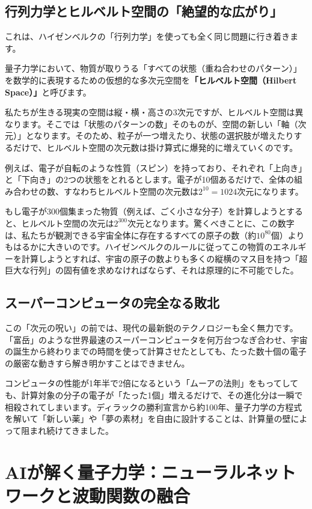 \subsection{行列力学とヒルベルト空間の「絶望的な広がり」}

これは、ハイゼンベルクの「行列力学」を使っても全く同じ問題に行き着きます。

量子力学において、物質が取りうる「すべての状態（重ね合わせのパターン）」を数学的に表現するための仮想的な多次元空間を\textbf{「ヒルベルト空間（Hilbert Space）」}と呼びます。

私たちが生きる現実の空間は縦・横・高さの3次元ですが、ヒルベルト空間は異なります。そこでは「状態のパターンの数」そのものが、空間の新しい「軸（次元）」となります。そのため、粒子が一つ増えたり、状態の選択肢が増えたりするだけで、ヒルベルト空間の次元数は掛け算式に爆発的に増えていくのです。

例えば、電子が自転のような性質（スピン）を持っており、それぞれ「上向き」と「下向き」の2つの状態をとれるとします。電子が10個あるだけで、全体の組み合わせの数、すなわちヒルベルト空間の次元数は\(2^{10} = 1024\)次元になります。

もし電子が300個集まった物質（例えば、ごく小さな分子）を計算しようとすると、ヒルベルト空間の次元は\(2^{300}\)次元となります。驚くべきことに、この数字は、私たちが観測できる宇宙全体に存在するすべての原子の数（約\(10^{80}\)個）よりもはるかに大きいのです。ハイゼンベルクのルールに従ってこの物質のエネルギーを計算しようとすれば、宇宙の原子の数よりも多くの縦横のマス目を持つ「超巨大な行列」の固有値を求めなければならず、それは原理的に不可能でした。

\subsection{スーパーコンピュータの完全なる敗北}

この「次元の呪い」の前では、現代の最新鋭のテクノロジーも全く無力です。「富岳」のような世界最速のスーパーコンピュータを何万台つなぎ合わせ、宇宙の誕生から終わりまでの時間を使って計算させたとしても、たった数十個の電子の厳密な動きすら解き明かすことはできません。

コンピュータの性能が1年半で2倍になるという「ムーアの法則」をもってしても、計算対象の分子の電子が「たった1個」増えるだけで、その進化分は一瞬で相殺されてしまいます。ディラックの勝利宣言から約100年、量子力学の方程式を解いて「新しい薬」や「夢の素材」を自由に設計することは、計算量の壁によって阻まれ続けてきました。

\section{AIが解く量子力学：ニューラルネットワークと波動関数の融合}

